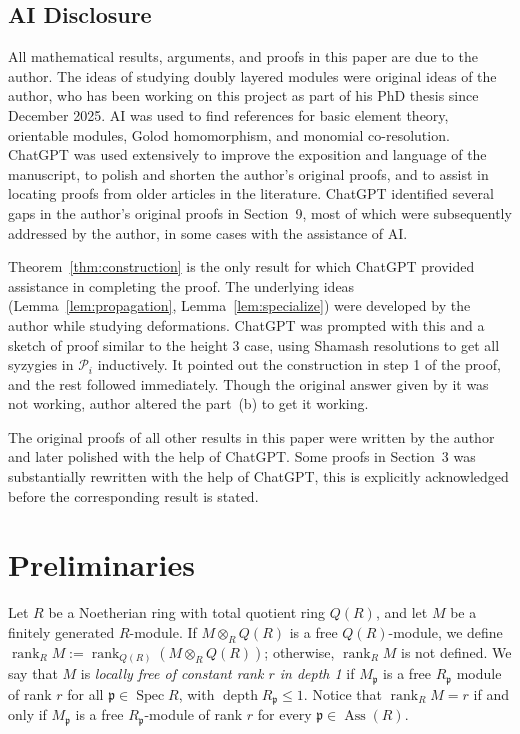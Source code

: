 \documentclass[11pt,letterpaper]{amsart}
\DeclareMathOperator{\dep}{depth}
\DeclareMathOperator{\Ass}{Ass}
\DeclareMathOperator{\Spec}{Spec}
\DeclareMathOperator{\rank}{rank}
\theoremstyle{plain}
\theoremstyle{definition}
\theoremstyle{remark}
\begin{document}
\subsection{AI Disclosure}
All mathematical results, arguments, and proofs in this paper are due to the author. The ideas of studying doubly layered modules were original ideas of the author, who has been working on this project as part of his PhD thesis since December 2025. AI was used to find references for basic element theory, orientable modules, Golod homomorphism, and monomial co-resolution. ChatGPT was used extensively to improve the exposition and language of the manuscript, to polish and shorten the author's original proofs, and to assist in locating proofs from older articles in the literature. ChatGPT identified several gaps in the author's original proofs in Section~9, most of which were subsequently addressed by the author, in some cases with the assistance of AI.

Theorem~\ref{thm:construction} is the only result for which ChatGPT provided assistance in completing the proof. The underlying ideas (Lemma~\ref{lem:propagation}, Lemma~\ref{lem:specialize}) were developed by the author while studying deformations. ChatGPT was prompted with this and a sketch of proof similar to the height 3 case, using Shamash resolutions to get all syzygies in $\mathcal{P}_i$ inductively. It pointed out the construction in step 1 of the proof, and the rest followed immediately. Though the original answer given by it was not working, author altered the part~(b) to get it working.  

The original proofs of all other results in this paper were written by the author and later polished with the help of ChatGPT. Some proofs in Section~3 was substantially rewritten with the help of ChatGPT, this is explicitly acknowledged before the corresponding result is stated.

\section{Preliminaries} 
Let \(R\) be a Noetherian ring with total quotient ring \(Q(R)\), and let $M$ be a finitely generated $R$-module. If \(M\otimes_R Q(R)\) is a free \(Q(R)\)-module, we define $\rank_R M:=\rank_{Q(R)}(M\otimes_R Q(R))$; otherwise, \(\rank_R M\) is not defined. We say that $M$ is \emph{locally free of constant rank $r$ in depth 1} if $M_\mathfrak p$ is a free $R_\mathfrak p$ module of rank $r$ for all $\mathfrak p\in\Spec R$, with $\dep R_\mathfrak p\le 1$. Notice that $\rank_R M=r$ if and only if $M_{\mathfrak p}$ is a free $R_{\mathfrak p}$-module of rank $r$ for every $\mathfrak p\in\Ass(R)$. 
\end{document}

